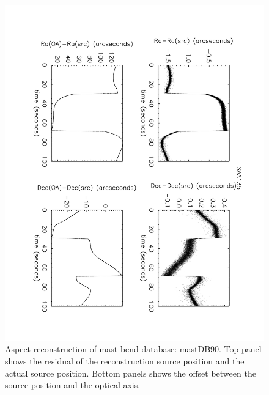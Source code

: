 \begin{figure}[htbp] %
   \centering
   \includegraphics[width=14cm, angle=180]{images/test5.pdf} 
   \caption{\footnotesize{Aspect reconstruction of mast bend database: mastDB90. Top panel shows the residual of the reconstruction source position and the actual source position. Bottom panels shows the offset between the source position and the optical axis.}}
   \label{test5}
\end{figure}


%